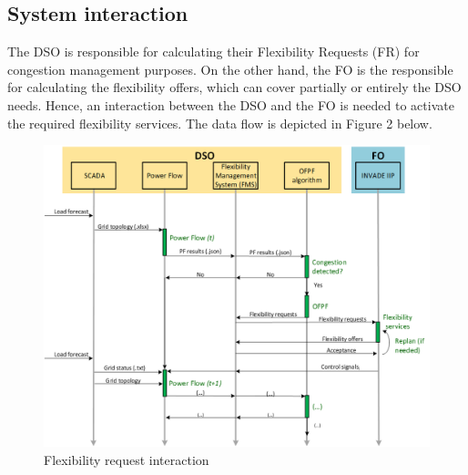 
\subsection{System interaction}
The DSO is responsible for calculating their Flexibility Requests (FR) for congestion management purposes. On the other hand, the FO is the responsible for calculating the flexibility offers, which can cover partially or entirely the DSO needs. Hence, an interaction between the DSO and the FO is needed to activate the required flexibility services. The data flow is depicted in Figure 2 below.

\begin{figure}[h]
	\centering
	\includegraphics[width=1\columnwidth ]{ChapterOPF_DSO/Figures/INTERACTION.png}
		\caption{Flexibility request interaction}
	\label{fig:pimodel}  
\end{figure}

